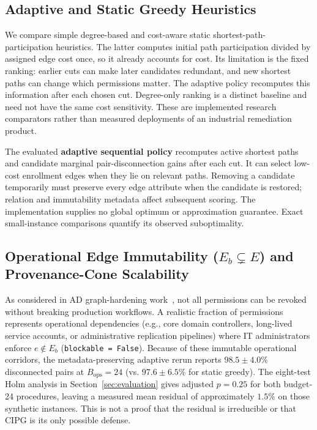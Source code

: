 \subsection{Adaptive and Static Greedy Heuristics}
We compare simple degree-based and cost-aware static shortest-path-participation heuristics. The latter computes initial path participation divided by assigned edge cost once, so it already accounts for cost. Its limitation is the fixed ranking: earlier cuts can make later candidates redundant, and new shortest paths can change which permissions matter. The adaptive policy recomputes this information after each chosen cut. Degree-only ranking is a distinct baseline and need not have the same cost sensitivity. These are implemented research comparators rather than measured deployments of an industrial remediation product.

The evaluated \textbf{adaptive sequential policy} recomputes active shortest paths and candidate marginal pair-disconnection gains after each cut. It can select low-cost enrollment edges when they lie on relevant paths. Removing a candidate temporarily must preserve every edge attribute when the candidate is restored; relation and immutability metadata affect subsequent scoring. The implementation supplies no global optimum or approximation guarantee. Exact small-instance comparisons quantify its observed suboptimality.

\subsection{Operational Edge Immutability ($E_b \subsetneq E$) and Provenance-Cone Scalability}
As considered in AD graph-hardening work~\cite{goel2024hardening}, not all permissions can be revoked without breaking production workflows. A realistic fraction of permissions represents operational dependencies (e.g., core domain controllers, long-lived service accounts, or administrative replication pipelines) where IT administrators enforce $e \notin E_b$ (\texttt{blockable = False}). Because of these immutable operational corridors, the metadata-preserving adaptive rerun reports $98.5 \pm 4.0\%$ disconnected pairs at $B_{\text{ops}}=24$ (vs. $97.6 \pm 6.5\%$ for static greedy). The eight-test Holm analysis in Section~\ref{sec:evaluation} gives adjusted $p=0.25$ for both budget-24 procedures, leaving a measured mean residual of approximately $1.5\%$ on those synthetic instances. This is not a proof that the residual is irreducible or that CIPG is its only possible defense.

